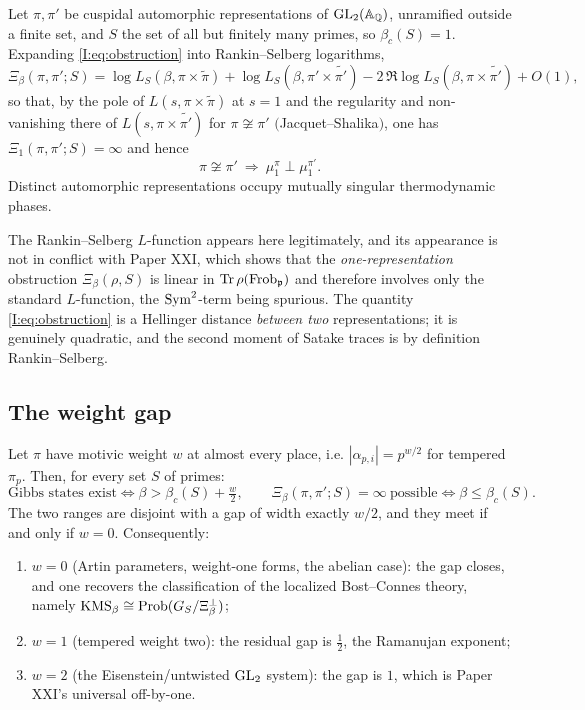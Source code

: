 \begin{corollary}\label{I:cor:multone}
Let $\pi,\pi'$ be cuspidal automorphic representations of $\mathrm{GL}_2(\mathbb{A}_{\mathbb{Q}})$, unramified
outside a finite set, and $S$ the set of all but finitely many primes, so
$\beta_c(S)=1$. Expanding \eqref{I:eq:obstruction} into Rankin--Selberg logarithms,
\[
\Xi_\beta(\pi,\pi';S)=\log L_S(\beta,\pi\times\widetilde\pi)
+\log L_S(\beta,\pi'\times\widetilde{\pi'})
-2\,\Re\log L_S(\beta,\pi\times\widetilde{\pi'})+O(1),
\]
so that, by the pole of $L(s,\pi\times\widetilde\pi)$ at $s=1$ and the regularity and
non-vanishing there of $L(s,\pi\times\widetilde{\pi'})$ for $\pi\not\cong\pi'$
$($Jacquet--Shalika$)$, one has $\Xi_1(\pi,\pi';S)=\infty$ and hence
\[
\pi\not\cong\pi'\ \Longrightarrow\ \mu^\pi_1\perp\mu^{\pi'}_1 .
\]
Distinct automorphic representations occupy mutually singular thermodynamic phases.
\end{corollary}

\begin{remark}
The Rankin--Selberg $L$-function appears here legitimately, and its appearance is not in
conflict with Paper XXI, which shows that the \emph{one-representation} obstruction
$\Xi_\beta(\rho,S)$ is linear in $\operatorname{Tr}\rho(\operatorname{Frob}_{\mathfrak{p}})$ and therefore involves only the
standard $L$-function, the $\operatorname{Sym}^2$-term being spurious. The quantity
\eqref{I:eq:obstruction} is a Hellinger distance \emph{between two} representations; it is
genuinely quadratic, and the second moment of Satake traces is by definition
Rankin--Selberg.
\end{remark}

\subsection{The weight gap}

\begin{theorem}\label{I:thm:gap}
Let $\pi$ have motivic weight $w$ at almost every place, i.e.
$|\alpha_{p,i}|=p^{w/2}$ for tempered $\pi_p$. Then, for every set $S$ of primes:
\[
\text{Gibbs states exist}\iff\beta>\beta_c(S)+\tfrac{w}{2},
\qquad
\Xi_\beta(\pi,\pi';S)=\infty\ \text{possible}\iff\beta\le\beta_c(S).
\]
The two ranges are disjoint with a gap of width exactly $w/2$, and they meet if and only
if $w=0$. Consequently:
\begin{enumerate}
\item[(i)] $w=0$ (Artin parameters, weight-one forms, the abelian case): the gap
closes, and one recovers the classification of the localized Bost--Connes theory,
namely $\mathrm{KMS}_\beta\cong\operatorname{Prob}(G_S/\Xi_\beta^\perp)$;
\item[(ii)] $w=1$ (tempered weight two): the residual gap is $\tfrac12$, the Ramanujan
exponent;
\item[(iii)] $w=2$ (the Eisenstein/untwisted $\mathrm{GL}_2$ system): the gap is $1$, which is
Paper XXI's universal off-by-one.
\end{enumerate}
\end{theorem}

